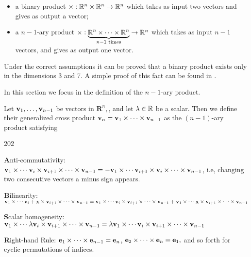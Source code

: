 \begin{itemize} 
\item a binary product $\times :\mathbb{R}^n\times \mathbb{R}^n \to \mathbb{R}^n$ which takes as input two vectors and
  gives as output a vector;
\item
  a $n-1$-ary product $\times :\underbrace{\mathbb{R}^n\times \dots \times  \mathbb{R}^n}_{n-1 \text{ times}}  \to \mathbb{R}^n$  which takes as input
  \(n-1\) vectors, and gives as output one  vector.
\end{itemize}

Under the correct assumptions it can be proved that a binary product exists only in the dimensions 3 and 7. A simple proof of this fact can be found in \cite{mcloughlin2012does}.

In this section we focus in the definition of the $n-1$-ary product. 


\begin{df} Let $\mathbf{ v}_1,\dots,\mathbf{ v}_{n-1}$ be vectors in
\(\mathbf{R}^n,\), and let  $\lambda \in
\mathbb{R}$ be a scalar. Then we  define their generalized cross product
\( \mathbf{ v}_{n} = \mathbf{ v}_1 \times \cdots \times \mathbf{ v}_{n-1}\) as the \( (n-1)\)-ary product satisfying
\begin{dingautolist}{202}
\item {\textbf  Anti-commutativity:} 
$\mathbf{ v}_1 \times \cdots \mathbf{ v}_i \times \mathbf{ v}_{i+1}  \times \dots \times  \mathbf{ v}_{n-1}= -
\mathbf{ v}_1 \times \cdots \mathbf{ v}_{i+1} \times \mathbf{ v}_{i}  \times \dots \times  \mathbf{ v}_{n-1}$,
i.e, changing two consecutive vectors a minus sign appears.
\item {\textbf
Bilinearity:} 
$\mathbf{ v}_1 \times \cdots \mathbf{ v}_i+\mathbf{ x} \times \mathbf{ v}_{i+1}  \times \dots \times  \mathbf{ v}_{n-1}
=\mathbf{ v}_1 \times \cdots \mathbf{ v}_i \times \mathbf{ v}_{i+1}  \times \dots \times  \mathbf{ v}_{n-1} +
\mathbf{ v}_1 \times \cdots \mathbf{ x} \times \mathbf{ v}_{i+1}  \times \dots \times  \mathbf{ v}_{n-1}$

\item {\textbf  Scalar homogeneity:}
$\mathbf{ v}_1 \times \cdots \lambda \mathbf{ v}_i \times \mathbf{ v}_{i+1}  \times \dots \times  \mathbf{ v}_{n-1}
=\lambda \mathbf{ v}_1 \times \cdots \mathbf{ v}_i \times \mathbf{ v}_{i+1}  \times \dots \times  \mathbf{ v}_{n-1}$

\item {\textbf  Right-hand Rule:}
\( \mathbf{ e}_{1} \times \cdots \times \mathbf{ e}_{n-1} = \mathbf{ e}_n\),
\( \mathbf{ e}_{2} \times \cdots \times \mathbf{ e}_n = \mathbf{ e}_{1},\) and so forth for
cyclic permutations of indices.

\end{dingautolist}
\end{df}

